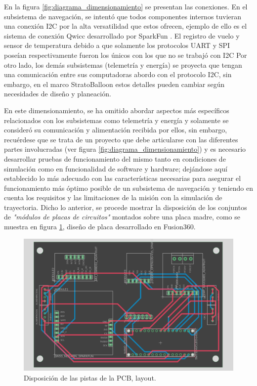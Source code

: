 En la figura \ref{fig:diagrama_dimensionamiento} se presentan las conexiones. En el subsistema de navegación, se intentó que todos componentes internos tuvieran una conexión I2C  por la alta versatilidad que estos ofrecen, ejemplo de ello es el sistema de conexión Qwicc desarrollado por SparkFun \cite{qwiic}.  El registro de vuelo y sensor de temperatura debido a que solamente los protocolos UART y SPI  poseían respectivamente fueron los únicos con los que no se trabajó con I2C Por otro lado, los demás subsistemas (telemetría y energía) se proyecta que tengan una comunicación entre sus computadoras abordo con el protocolo I2C, sin embargo, en el marco StratoBalloon estos detalles pueden cambiar según necesidades de diseño y planeación.

\newpage

En este dimensionamiento, se ha omitido abordar aspectos más específicos relacionados con los subsistemas como telemetría y energía y solamente se consideró su comunicación y alimentación recibida por ellos,  sin embargo,  recuérdese que se trata de un proyecto que debe articularse con las diferentes partes involucradas (ver figura \ref{fig:diagrama_dimensionamiento}) y es necesario desarrollar pruebas de funcionamiento del mismo tanto en condiciones de simulación como en funcionalidad de software y hardware;  dejándose aquí establecido lo más adecuado con las características necesarias para asegurar el funcionamiento más óptimo posible de un subsistema de navegación y teniendo en cuenta los requisitos y las limitaciones de la misión con la simulación de trayectoria. Dicho lo anterior, se procede mostrar la disposición de los conjuntos de \textit{"módulos de placas de circuitos"} montados sobre una placa madre, como se muestra en figura \ref{fig:layout}, diseño de placa desarrollado en Fusion360.

\begin{figure} [h]
    \centering
    \includegraphics[width=0.75\linewidth]{document/figures/04_layout.png}
    \caption{Disposición de las pistas de la PCB, layout. }
    \label{fig:layout}
\end{figure}

